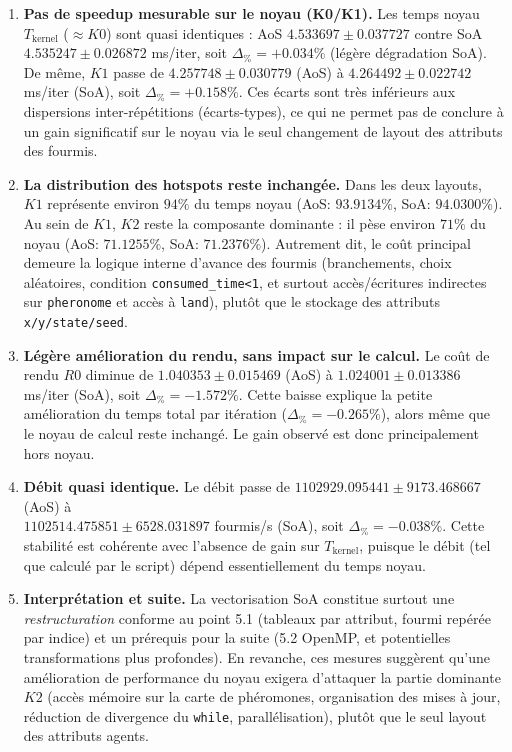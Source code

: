 \begin{enumerate}[leftmargin=*]
    \item \textbf{Pas de speedup mesurable sur le noyau (K0/K1).}
    Les temps noyau \(T_{\text{kernel}}\) (\(\approx K0\)) sont quasi identiques : AoS \(4.533697 \pm 0.037727\)
    contre SoA \(4.535247 \pm 0.026872\) ms/iter, soit \(\Delta_{\%}=+0.034\%\) (légère dégradation SoA).
    De même, \(K1\) passe de \(4.257748 \pm 0.030779\) (AoS) à \(4.264492 \pm 0.022742\) ms/iter (SoA),
    soit \(\Delta_{\%}=+0.158\%\).
    Ces écarts sont très inférieurs aux dispersions inter-répétitions (écarts-types), ce qui ne permet pas
    de conclure à un gain significatif sur le noyau via le seul changement de layout des attributs des fourmis.

    \item \textbf{La distribution des hotspots reste inchangée.}
    Dans les deux layouts, \(K1\) représente environ \(94\%\) du temps noyau
    (AoS: \(93.9134\%\), SoA: \(94.0300\%\)).
    Au sein de \(K1\), \(K2\) reste la composante dominante : il pèse environ \(71\%\) du noyau
    (AoS: \(71.1255\%\), SoA: \(71.2376\%\)).
    Autrement dit, le coût principal demeure la logique interne d'avance des fourmis (branchements,
    choix aléatoires, condition \texttt{consumed\_time<1}, et surtout accès/écritures indirectes sur
    \texttt{pheronome} et accès à \texttt{land}), plutôt que le stockage des attributs
    \texttt{x/y/state/seed}.

    \item \textbf{Légère amélioration du rendu, sans impact sur le calcul.}
    Le coût de rendu \(R0\) diminue de \(1.040353 \pm 0.015469\) (AoS) à \(1.024001 \pm 0.013386\) ms/iter (SoA),
    soit \(\Delta_{\%}=-1.572\%\). Cette baisse explique la petite amélioration du temps total par itération
    (\(\Delta_{\%}=-0.265\%\)), alors même que le noyau de calcul reste inchangé. Le gain observé est donc
    principalement hors noyau.

    \item \textbf{Débit quasi identique.}
    Le débit passe de \(1102929.095441 \pm 9173.468667\) 
    (AoS) à \\
    \(1102514.475851 \pm 6528.031897\) fourmis/s (SoA),
    soit \(\Delta_{\%}=-0.038\%\). Cette stabilité est cohérente avec l'absence de gain sur \(T_{\text{kernel}}\),
    puisque le débit (tel que calculé par le script) dépend essentiellement du temps noyau.

    \item \textbf{Interprétation et suite.}
    La vectorisation SoA constitue surtout une \emph{restructuration} conforme au point 5.1 (tableaux par attribut,
    fourmi repérée par indice) et un prérequis pour la suite (5.2 OpenMP, et potentielles transformations
    plus profondes). En revanche, ces mesures suggèrent qu'une amélioration de performance du noyau exigera
    d'attaquer la partie dominante \(K2\) (accès mémoire sur la carte de phéromones, organisation des mises à jour,
    réduction de divergence du \texttt{while}, parallélisation), plutôt que le seul layout des attributs agents.
\end{enumerate}
